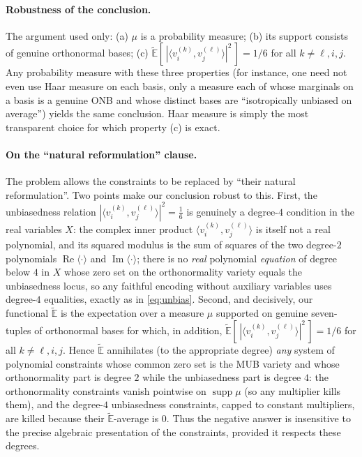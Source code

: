 \documentclass{amsart}
\theoremstyle{definition}
\theoremstyle{remark}
\begin{document}
\paragraph{Robustness of the conclusion.}
The argument used only: (a) $\mu$ is a probability measure; (b) its support consists of genuine
orthonormal bases; (c) $\widetilde{\mathbb{E}}[\,|\langle v^{(k)}_i,v^{(\ell)}_j\rangle|^2\,]=1/6$
for all $k\ne\ell,i,j$. Any probability measure with these three properties (for instance, one
need not even use Haar measure on each basis, only a measure each of whose marginals on a basis
is a genuine ONB and whose distinct bases are ``isotropically unbiased on average'') yields the
same conclusion. Haar measure is simply the most transparent choice for which
property (c) is exact.

\paragraph{On the ``natural reformulation'' clause.}
The problem allows the constraints to be replaced by ``their natural reformulation''.
Two points make our conclusion robust to this. First, the unbiasedness relation
$|\langle v^{(k)}_i,v^{(\ell)}_j\rangle|^2=\tfrac16$ is genuinely a degree-$4$ condition in
the real variables $X$: the complex inner product $\langle v^{(k)}_i,v^{(\ell)}_j\rangle$ is
itself not a real polynomial, and its squared modulus is the sum of squares of the two
degree-$2$ polynomials $\operatorname{Re}\langle\cdot\rangle$ and
$\operatorname{Im}\langle\cdot\rangle$; there is no \emph{real} polynomial \emph{equation} of
degree below $4$ in $X$ whose zero set on the orthonormality variety equals the unbiasedness
locus, so any faithful encoding without auxiliary variables uses degree-$4$ equalities, exactly
as in \eqref{eq:unbias}. Second, and decisively, our functional $\widetilde{\mathbb{E}}$ is the
expectation over a measure $\mu$ supported on genuine seven-tuples of orthonormal bases for
which, in addition, $\widetilde{\mathbb{E}}[\,|\langle v^{(k)}_i,v^{(\ell)}_j\rangle|^2\,]=1/6$
for all $k\ne\ell,i,j$. Hence $\widetilde{\mathbb{E}}$ annihilates (to the appropriate degree)
\emph{any} system of polynomial constraints whose common zero set is the MUB variety and whose
orthonormality part is degree $2$ while the unbiasedness part is degree $4$: the orthonormality
constraints vanish pointwise on $\operatorname{supp}\mu$ (so any multiplier kills them), and the
degree-$4$ unbiasedness constraints, capped to constant multipliers, are killed because their
$\widetilde{\mathbb{E}}$-average is $0$. Thus the negative answer is insensitive to the precise
algebraic presentation of the constraints, provided it respects these degrees.
\end{document}
